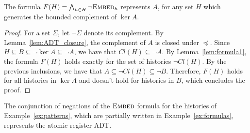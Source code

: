 \begin{lemma}\label{lem:formula2}

  The formula $F(H)=\bigwedge_{h \in H} \neg \textsc{Embed}_h$ represents $A$,
  for any set $H$ which generates the bounded complement of $\ker A$.

\end{lemma}
\begin{proof}
For a set $\Sigma$, let $\neg \Sigma$ denote its complement.
By Lemma~\ref{lem:ADT_closure}, the complement of $A$ is closed under $\preceq$. Since
$H\subseteq B\subseteq  \neg \ker A \subseteq \neg A$, we have that $Cl(H)\subseteq \neg A$.
By Lemma~\ref{lem:formula1}, the formula $F(H)$ holds exactly for the set of histories $\neg Cl(H)$.
By the previous inclusions, we have that $A\subseteq \neg Cl(H)\subseteq \neg B$.
Therefore, $F(H)$ holds for all histories in $\ker A$
and doesn't hold for histories in $B$, which concludes the proof.
\end{proof}

\begin{example}

  The conjunction of negations of the $\textsc{Embed}$ formula for the
  histories of Example~\ref{ex:patterns}, which are partially written in
  Example~\ref{ex:formulas}, represents the atomic register ADT.

\end{example}

%
%
%
